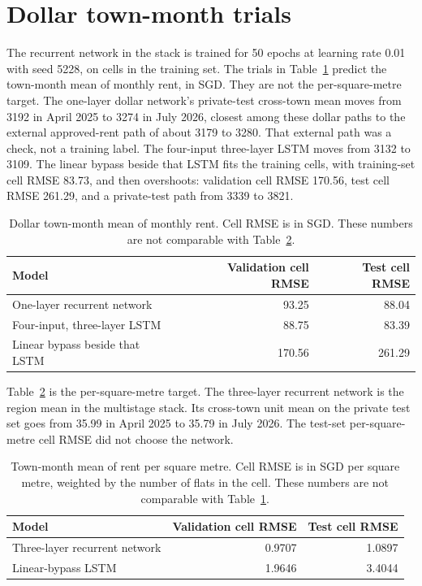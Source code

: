 \documentclass[11pt,a4paper]{article}
\begin{document}
\section{Dollar town-month trials}
\label{app:dollar}

The recurrent network in the stack is trained for 50 epochs at learning rate 0.01 with seed 5228, on cells in the training set.
The trials in Table~\ref{tab:dollar} predict the town-month mean of monthly rent, in SGD.
They are not the per-square-metre target.
The one-layer dollar network's private-test cross-town mean moves from 3192 in April 2025 to 3274 in July 2026, closest among these dollar paths to the external approved-rent path of about 3179 to 3280.
That external path was a check, not a training label.
The four-input three-layer LSTM moves from 3132 to 3109.
The linear bypass beside that LSTM fits the training cells, with training-set cell RMSE 83.73, and then overshoots: validation cell RMSE 170.56, test cell RMSE 261.29, and a private-test path from 3339 to 3821.

\begin{table}[htbp]
\centering
\caption{Dollar town-month mean of monthly rent.
Cell RMSE is in SGD.
These numbers are not comparable with Table~\ref{tab:unit}.}
\label{tab:dollar}
\small
\begin{tabular}{lrr}
\toprule
Model & Validation cell RMSE & Test cell RMSE \\
\midrule
One-layer recurrent network & 93.25 & 88.04 \\
Four-input, three-layer LSTM & 88.75 & 83.39 \\
Linear bypass beside that LSTM & 170.56 & 261.29 \\
\bottomrule
\end{tabular}
\end{table}

Table~\ref{tab:unit} is the per-square-metre target.
The three-layer recurrent network is the region mean in the multistage stack.
Its cross-town unit mean on the private test set goes from 35.99 in April 2025 to 35.79 in July 2026.
The test-set per-square-metre cell RMSE did not choose the network.

\begin{table}[htbp]
\centering
\caption{Town-month mean of rent per square metre.
Cell RMSE is in SGD per square metre, weighted by the number of flats in the cell.
These numbers are not comparable with Table~\ref{tab:dollar}.}
\label{tab:unit}
\small
\begin{tabular}{lrr}
\toprule
Model & Validation cell RMSE & Test cell RMSE \\
\midrule
Three-layer recurrent network & 0.9707 & 1.0897 \\
Linear-bypass LSTM & 1.9646 & 3.4044 \\
\bottomrule
\end{tabular}
\end{table}
\end{document}
